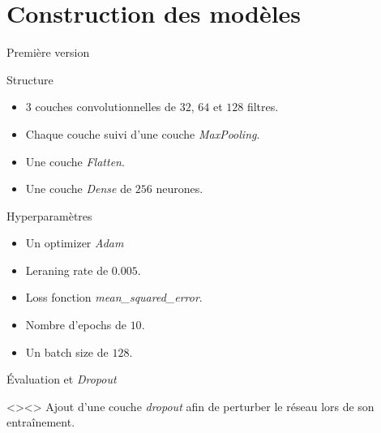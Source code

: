 \documentclass[10pt,handout]{beamer}
\newif\ifplacelogo %
\begin{document}
\section{Construction des modèles}
\placelogofalse
\begin{frame}{Première version}
    \begin{block}{Structure}
        \begin{itemize}
            \item $3$ couches convolutionnelles de $32$, $64$ et $128$ filtres.
            \item Chaque couche suivi d'une couche \textit{MaxPooling}.
            \item Une couche \textit{Flatten}.
            \item Une couche \textit{Dense} de $256$ neurones.
        \end{itemize}
    \end{block}
    \begin{block}{Hyperparamètres}
        \begin{itemize}
            \item Un optimizer \textit{Adam}
            \item Leraning rate de $0.005$.
            \item Loss fonction \textit{mean\_squared\_error}.
            \item Nombre d'epochs de $10$.
            \item Un batch size de $128$.
        \end{itemize}
    \end{block}
\end{frame}

\begin{frame}{Évaluation et \textit{Dropout}}
    \begin{block}<>{}<>
        Ajout d'une couche \textit{dropout} afin de perturber le réseau lors de
        son entraînement.
    \end{block}

    \begin{figure}
        \qquad
    \end{figure}

\end{frame}
\end{document}
